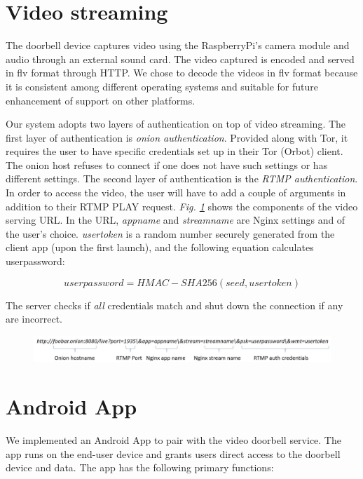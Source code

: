 \section{Video streaming}
The doorbell device captures video using the RaspberryPi's camera module and audio through an external sound card. The video captured is encoded and served in flv format through HTTP. We chose to decode the videos in flv format because it is consistent among different operating systems and suitable for future enhancement of support on other platforms. 

Our system adopts two layers of authentication on top of video streaming. The first layer of authentication is \textit{onion authentication}. Provided along with Tor, it requires the user to have specific credentials set up in their Tor (Orbot) client. The onion host refuses to connect if one does not have such settings or has different settings. The second layer of authentication is the \textit{RTMP authentication}. In order to access the video, the user will have to add a couple of arguments in addition to their RTMP PLAY request. \textit{Fig. \ref{fig:url}} shows the components of the video serving URL. In the URL, \textit{appname} and \textit{streamname} are Nginx settings and of the user's choice. \textit{usertoken} is a random number securely generated from the client app (upon the first launch), and the following equation calculates userpassword:

\[
userpassword = HMAC-SHA256(seed, usertoken)
\]

The server checks if \textit{all} credentials match and shut down the connection if any are incorrect.

\begin{figure}
	\includegraphics[width=\linewidth]{fig_url.jpg}
	\caption{}
	\label{fig:url}
\end{figure}



\section{Android App}
We implemented an Android App to pair with the video doorbell service. The app runs on the end-user device and grants users direct access to the doorbell device and data. The app has the following primary functions:

